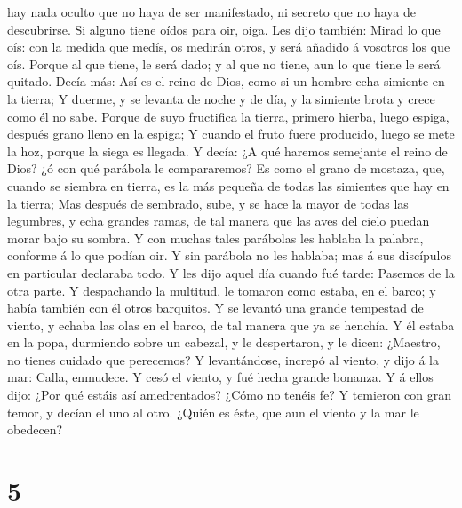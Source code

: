hay nada oculto que no haya de ser manifestado, ni secreto que no haya
de descubrirse.  Si alguno tiene oídos para oir, oiga.
 Les dijo también: Mirad lo que oís: con la medida que
medís, os medirán otros, y será añadido á vosotros los que oís.
 Porque al que tiene, le será dado; y al que no tiene,
aun lo que tiene le será quitado.  Decía más: Así es el
reino de Dios, como si un hombre echa simiente en la tierra;
 Y duerme, y se levanta de noche y de día, y la simiente
brota y crece como él no sabe.  Porque de suyo fructifica
la tierra, primero hierba, luego espiga, después grano lleno en la
espiga;  Y cuando el fruto fuere producido, luego se mete
la hoz, porque la siega es llegada.  Y decía: ¿A qué
haremos semejante el reino de Dios? ¿ó con qué parábola le compararemos?
 Es como el grano de mostaza, que, cuando se siembra en
tierra, es la más pequeña de todas las simientes que hay en la tierra;
 Mas después de sembrado, sube, y se hace la mayor de
todas las legumbres, y echa grandes ramas, de tal manera que las aves
del cielo puedan morar bajo su sombra.  Y con muchas
tales parábolas les hablaba la palabra, conforme á lo que podían oir.
 Y sin parábola no les hablaba; mas á sus discípulos en
particular declaraba todo.  Y les dijo aquel día cuando
fué tarde: Pasemos de la otra parte.  Y despachando la
multitud, le tomaron como estaba, en el barco; y había también con él
otros barquitos.  Y se levantó una grande tempestad de
viento, y echaba las olas en el barco, de tal manera que ya se henchía.
 Y él estaba en la popa, durmiendo sobre un cabezal, y le
despertaron, y le dicen: ¿Maestro, no tienes cuidado que perecemos?
 Y levantándose, increpó al viento, y dijo á la mar:
Calla, enmudece. Y cesó el viento, y fué hecha grande bonanza.
 Y á ellos dijo: ¿Por qué estáis así amedrentados? ¿Cómo
no tenéis fe?  Y temieron con gran temor, y decían el uno
al otro. ¿Quién es éste, que aun el viento y la mar le obedecen?

\hypertarget{section-4}{%
\section{5}\label{section-4}}

